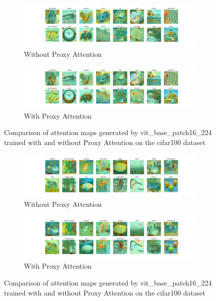 \begin{figure}[!htb]
    \centering
    \begin{subfigure}[b]{1\textwidth}
        \includegraphics[width=\textwidth]{images/gpp_cifar100_vit_base_patch16_224_noproxy_2.pdf}
        \caption{Without Proxy Attention}
    \end{subfigure}
    \hfill
    \begin{subfigure}[b]{1\textwidth}
        \includegraphics[width=\textwidth]{images/gpp_cifar100_vit_base_patch16_224_proxy_2.pdf}
        \caption{With Proxy Attention}
    \end{subfigure}
    \caption{Comparison of attention maps generated by vit\_base\_patch16\_224 trained with and without Proxy Attention on the cifar100 dataset}
\end{figure}


\begin{figure}[!htb]
    \centering
    \begin{subfigure}[b]{1\textwidth}
        \includegraphics[width=\textwidth]{images/gpp_cifar100_vit_base_patch16_224_noproxy_3.pdf}
        \caption{Without Proxy Attention}
    \end{subfigure}
    \hfill
    \begin{subfigure}[b]{1\textwidth}
        \includegraphics[width=\textwidth]{images/gpp_cifar100_vit_base_patch16_224_proxy_3.pdf}
        \caption{With Proxy Attention}
    \end{subfigure}
    \caption{Comparison of attention maps generated by vit\_base\_patch16\_224 trained with and without Proxy Attention on the cifar100 dataset}
\end{figure}


